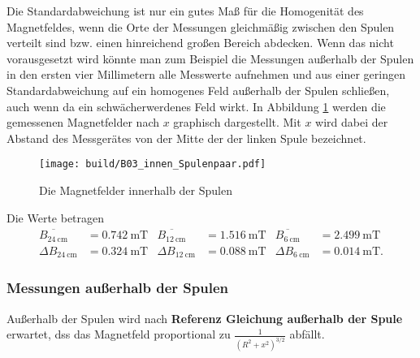 Die Standardabweichung ist nur ein gutes Maß für die Homogenität des Magnetfeldes, 
wenn die Orte der Messungen gleichmäßig zwischen den Spulen verteilt sind bzw. einen hinreichend großen Bereich abdecken.
Wenn das nicht vorausgesetzt wird könnte man zum Beispiel die Messungen außerhalb der Spulen in den ersten vier Millimetern
alle Messwerte aufnehmen und aus einer geringen Standardabweichung auf ein homogenes Feld außerhalb der Spulen schließen,
auch wenn da ein schwächerwerdenes Feld wirkt.
%
%
In Abbildung \ref{fig:B03_innen} werden die gemessenen Magnetfelder nach $x$ graphisch dargestellt.
Mit $x$ wird dabei der Abstand des Messgerätes von der Mitte der der linken Spule bezeichnet.
\begin{figure}
    \centering
    \caption{Die Magnetfelder innerhalb der Spulen}
    \label{fig:B03_innen}
    \texttt{[image: build/B03\_innen\_Spulenpaar.pdf]}
\end{figure}
%
Die Werte betragen
\begin{align}
    \nonumber   
    \overline{B_{\qty{24}{\centi\meter}}}&= \qty[]{0.742}{\milli\tesla}      &
    \overline{B_{\qty{12}{\centi\meter}}}&= \qty[]{1.516}{\milli\tesla}     &
    \overline{B_{\qty{6 }{\centi\meter}}}&= \qty[]{2.499}{\milli\tesla}     \\
    \Delta B_{\qty{24}{\centi\meter}}&= \qty[]{0.324}{\milli\tesla}      &
    \Delta B_{\qty{12}{\centi\meter}}&= \qty[]{0.088}{\milli\tesla}      &
    \Delta B_{\qty{6 }{\centi\meter}}&= \qty[]{0.014}{\milli\tesla}.
    \label{erg:B03Standardabweichungen} 
\end{align}

\subsubsection{Messungen außerhalb der Spulen}
Außerhalb der Spulen wird nach \textbf{Referenz Gleichung außerhalb der Spule} erwartet, dss das Magnetfeld
proportional zu $\frac{1}{(R^2 + x^2)^{3/2}}$ abfällt.